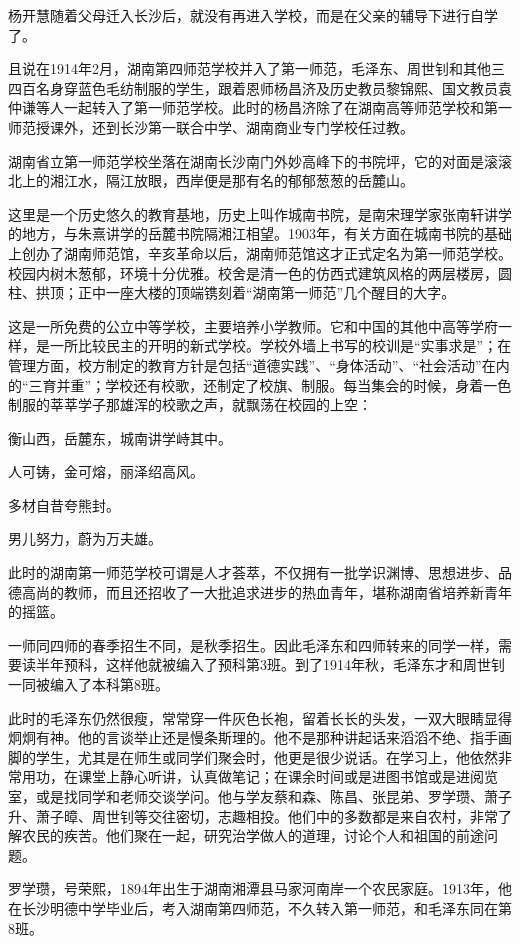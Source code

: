 \documentclass[../../dazhuan.tex]{subfiles}
\begin{document}
杨开慧随着父母迁入长沙后，就没有再进入学校，而是在父亲的辅导下进行自学了。

且说在1914年2月，湖南第四师范学校并入了第一师范，毛泽东、周世钊和其他三四百名身穿蓝色毛纺制服的学生，跟着恩师杨昌济及历史教员黎锦熙、国文教员袁仲谦等人一起转入了第一师范学校。此时的杨昌济除了在湖南高等师范学校和第一师范授课外，还到长沙第一联合中学、湖南商业专门学校任过教。

湖南省立第一师范学校坐落在湖南长沙南门外妙高峰下的书院坪，它的对面是滚滚北上的湘江水，隔江放眼，西岸便是那有名的郁郁葱葱的岳麓山。

这里是一个历史悠久的教育基地，历史上叫作城南书院，是南宋理学家张南轩讲学的地方，与朱熹讲学的岳麓书院隔湘江相望。1903年，有关方面在城南书院的基础上创办了湖南师范馆，辛亥革命以后，湖南师范馆这才正式定名为第一师范学校。校园内树木葱郁，环境十分优雅。校舍是清一色的仿西式建筑风格的两层楼房，圆柱、拱顶；正中一座大楼的顶端镌刻着“湖南第一师范”几个醒目的大字。

这是一所免费的公立中等学校，主要培养小学教师。它和中国的其他中高等学府一样，是一所比较民主的开明的新式学校。学校外墙上书写的校训是“实事求是”；在管理方面，校方制定的教育方针是包括“道德实践”、“身体活动”、“社会活动”在内的“三育并重”；学校还有校歌，还制定了校旗、制服。每当集会的时候，身着一色制服的莘莘学子那雄浑的校歌之声，就飘荡在校园的上空：

衡山西，岳麓东，城南讲学峙其中。

人可铸，金可熔，丽泽绍高风。

多材自昔夸熊封。

男儿努力，蔚为万夫雄。

此时的湖南第一师范学校可谓是人才荟萃，不仅拥有一批学识渊博、思想进步、品德高尚的教师，而且还招收了一大批追求进步的热血青年，堪称湖南省培养新青年的摇篮。

一师同四师的春季招生不同，是秋季招生。因此毛泽东和四师转来的同学一样，需要读半年预科，这样他就被编入了预科第3班。到了1914年秋，毛泽东才和周世钊一同被编入了本科第8班。

此时的毛泽东仍然很瘦，常常穿一件灰色长袍，留着长长的头发，一双大眼睛显得炯炯有神。他的言谈举止还是慢条斯理的。他不是那种讲起话来滔滔不绝、指手画脚的学生，尤其是在师生或同学们聚会时，他更是很少说话。在学习上，他依然非常用功，在课堂上静心听讲，认真做笔记；在课余时间或是进图书馆或是进阅览室，或是找同学和老师交谈学问。他与学友蔡和森、陈昌、张昆弟、罗学瓒、萧子升、萧子暲、周世钊等交往密切，志趣相投。他们中的多数都是来自农村，非常了解农民的疾苦。他们聚在一起，研究治学做人的道理，讨论个人和祖国的前途问题。

罗学瓒，号荣熙，1894年出生于湖南湘潭县马家河南岸一个农民家庭。1913年，他在长沙明德中学毕业后，考入湖南第四师范，不久转入第一师范，和毛泽东同在第8班。
\end{document}
